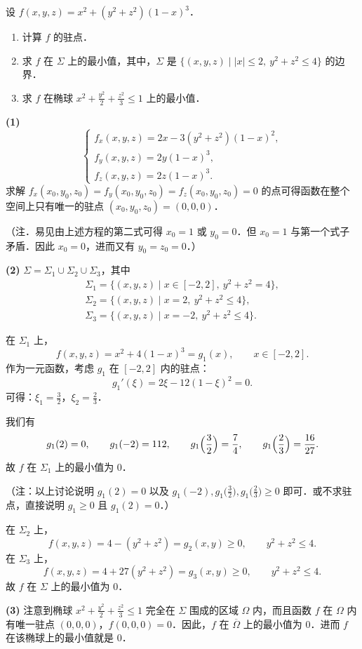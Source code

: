设 $f(x,y,z)=x^{2}+(y^{2}+z^{2})(1-x)^{3}$．
\begin{enumerate}[label=(\arabic*)]
  \item 计算 $f$ 的驻点．
  \item 求 $f$ 在 $\Sigma$ 上的最小值，其中，$\Sigma$ 是 $\{(x,y,z)\mid |x|\le 2,\ y^{2}+z^{2}\le 4\}$ 的边界．
  \item 求 $f$ 在椭球 $x^{2}+\frac{y^{2}}{2}+\frac{z^{2}}{3}\le 1$ 上的最小值．
\end{enumerate}
\begin{solution}
\textbf{(1)}
\[
\begin{cases}
f_{x}(x,y,z)=2x-3(y^{2}+z^{2})(1-x)^{2},\\
f_{y}(x,y,z)=2y(1-x)^{3},\\
f_{z}(x,y,z)=2z(1-x)^{3}.
\end{cases}
\]
求解 $f_{x}(x_{0},y_{0},z_{0})=f_{y}(x_{0},y_{0},z_{0})=f_{z}(x_{0},y_{0},z_{0})=0$ 的点可得函数在整个空间上只有唯一的驻点 $(x_{0},y_{0},z_{0})=(0,0,0)$．

（注．易见由上述方程的第二式可得 $x_{0}=1$ 或 $y_{0}=0$．但 $x_{0}=1$ 与第一个式子矛盾．因此 $x_{0}=0$，进而又有 $y_{0}=z_{0}=0$．）

\textbf{(2)} $\Sigma=\Sigma_{1}\cup\Sigma_{2}\cup\Sigma_{3}$，其中
\begin{gather*}
\Sigma_{1}=\{(x,y,z)\mid x\in[-2,2],\ y^{2}+z^{2}=4\},\\
\Sigma_{2}=\{(x,y,z)\mid x=2,\ y^{2}+z^{2}\le 4\},\\
\Sigma_{3}=\{(x,y,z)\mid x=-2,\ y^{2}+z^{2}\le 4\}.
\end{gather*}

在 $\Sigma_{1}$ 上，
\[
f(x,y,z)=x^{2}+4(1-x)^{3}=g_{1}(x),\qquad x\in[-2,2].
\]
作为一元函数，考虑 $g_{1}$ 在 $[-2,2]$ 内的驻点：
\[
g_{1}'(\xi)=2\xi-12(1-\xi)^{2}=0.
\]
可得：$\xi_{1}=\frac{3}{2}$，$\xi_{2}=\frac{2}{3}$．

我们有
\[
g_{1}(2)=0,\qquad g_{1}(-2)=112,\qquad g_{1}\Bigl(\frac{3}{2}\Bigr)=\frac{7}{4},\qquad g_{1}\Bigl(\frac{2}{3}\Bigr)=\frac{16}{27}.
\]
故 $f$ 在 $\Sigma_{1}$ 上的最小值为 $0$．

（注：以上讨论说明 $g_{1}(2)=0$ 以及 $g_{1}(-2),g_{1}\bigl(\frac{3}{2}\bigr),g_{1}\bigl(\frac{2}{3}\bigr)\ge 0$ 即可．或不求驻点，直接说明 $g_{1}\ge 0$ 且 $g_{1}(2)=0$．）

在 $\Sigma_{2}$ 上，
\[
f(x,y,z)=4-(y^{2}+z^{2})=g_{2}(x,y)\ge 0,\qquad y^{2}+z^{2}\le 4.
\]
在 $\Sigma_{3}$ 上，
\[
f(x,y,z)=4+27(y^{2}+z^{2})=g_{3}(x,y)\ge 0,\qquad y^{2}+z^{2}\le 4.
\]
故 $f$ 在 $\Sigma$ 上的最小值为 $0$．

\textbf{(3)} 注意到椭球 $x^{2}+\frac{y^{2}}{2}+\frac{z^{2}}{3}\le 1$ 完全在 $\Sigma$ 围成的区域 $\Omega$ 内，而且函数 $f$ 在 $\Omega$ 内有唯一驻点 $(0,0,0)$，$f(0,0,0)=0$．因此，$f$ 在 $\overline{\Omega}$ 上的最小值为 $0$．进而 $f$ 在该椭球上的最小值就是 $0$．
\end{solution}

